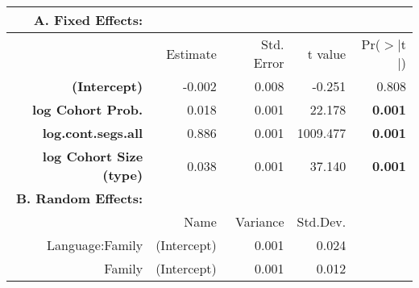 \begin{tabular}{rrrrr}
 {\bf A. Fixed Effects:} \\
\hline
 & Estimate & Std. Error & t value & Pr($>$$|$t$|$) \\ 
  \hline
{\bf (Intercept) } & -0.002 & 0.008 & -0.251 & 0.808 \\ 
 {\bf log Cohort Prob. } & 0.018 & 0.001 & 22.178 & {\bf 0.001} \\ 
 {\bf log.cont.segs.all } & 0.886 & 0.001 & 1009.477 & {\bf 0.001} \\ 
 {\bf log Cohort Size (type) }& 0.038 & 0.001 & 37.140 & {\bf 0.001} \\ 

\hline \hline
{\bf B. Random Effects:} \\
\hline
& Name & Variance & Std.Dev. \\
\hline
Language:Family & (Intercept) & 0.001 & 0.024 \\
Family & (Intercept) & 0.001 & 0.012 \\
\end{tabular}
